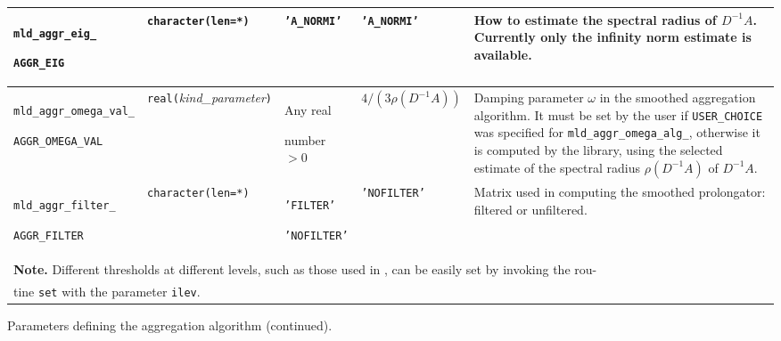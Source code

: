 \begin{center}
\begin{tabular}{|p{3.8cm}|l|p{2.5cm}|p{2.3cm}|p{6.6cm}|}
\verb|mld_aggr_eig_|  \par \verb|AGGR_EIG|    & \verb|character(len=*)|
                         & \texttt{'A\_NORMI'}
                         & \texttt{'A\_NORMI'}
                         & How to estimate the spectral radius of $D^{-1}A$.
                           Currently only the infinity norm estimate
                           is available. \\ \hline
\verb|mld_aggr_omega_val_| \par \verb|AGGR_OMEGA_VAL|    & \verb|real(|\emph{kind\_parameter}\verb|)|
                         & Any real \par number $>0$
                         & $4/(3\rho(D^{-1}A))$
                         & Damping parameter $\omega$ in the smoothed aggregation algorithm. 
                           It must be set by the user if
                           \verb|USER_CHOICE| was specified for 
                           \verb|mld_aggr_omega_alg_|,
                           otherwise it is computed by the library, using the
                           selected estimate of the spectral radius $\rho(D^{-1}A)$ of
                           $D^{-1}A$.\\ \hline
\verb|mld_aggr_filter_| \par \verb|AGGR_FILTER|  
                         & \verb|character(len=*)|
                         & \texttt{'FILTER'} \par \texttt{'NOFILTER'}
                         & \texttt{'NOFILTER'} & Matrix used in computing the smoothed
                            prolongator: filtered or unfiltered. \\
\hline
\multicolumn{5}{|l|}{{\bfseries Note.} Different thresholds at different levels, such as
those used in \cite[Section~5.1]{VANEK_MANDEL_BREZINA}, can be easily set  by 
invoking the rou-} \\
\multicolumn{5}{|l|}{tine \texttt{set} with
the parameter \texttt{ilev}.} \\
\hline
\end{tabular}
\end{center}
\caption{Parameters defining the aggregation algorithm (continued).
\label{tab:p_aggregation_1}} 
\esideways
                     
